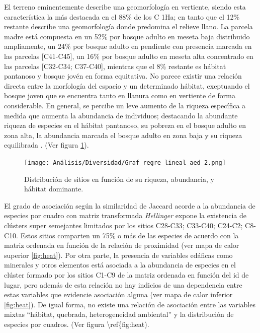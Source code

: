 \documentclass[11pt,]{article}
\begin{document}
El terreno eminentemente describe una geomorfología en vertiente, siendo
esta característica la más destacada en el 88\% de los C 1Ha; en tanto
que el 12\% restante describe una geomorfología donde predomina el
relieve llano. La parcela madre está compuesta en un 52\% por bosque
adulto en meseta baja distribuido ampliamente, un 24\% por bosque adulto
en pendiente con presencia marcada en las parcelas {[}C41-C45{]}, un
16\% por bosque adulto en meseta alta concentrado en las parcelas
{[}C32-C34; C37-C40{]}, mientras que el 8\% restante es hábitat
pantanoso y bosque jovén en forma equitativa. No parece existir una
relación directa entre la morfología del espacio y un determinado
hábitat, exeptuando el bosque joven que se encuentra tanto en llanura
como en vertiente de forma considerable. En general, se percibe un leve
aumento de la riqueza específica a medida que aumenta la abundancia de
individuos; destacando la abundante riqueza de especies en el hábitat
pantanoso, su pobreza en el bosque adulto en zona alta, la abundancia
marcada el bosque adulto en zona baja y su riqueza equilibrada . (Ver
figura \ref{fig:leal}).

\begin{figure}
\centering
\texttt{[image: Análisis/Diversidad/Graf\_regre\_lineal\_aed\_2.png]}
\caption{Distribución de sitios en función de su riqueza, abundancia, y
hábitat dominante.\label{fig:leal}}
\end{figure}

El grado de asociación según la similaridad de Jaccard acorde a la
abundancia de especies por cuadro con matriz transformada
\emph{Hellinger} expone la existencia de clústers super semejantes
limitados por los sitios C28-C33; C33-C40; C24-C2; C8-C10. Estos sitios
comparten un 75\% o más de las especies de acuerdo con la matriz
ordenada en función de la relación de proximidad (ver mapa de calor
superior \ref{fig:heat}). Por otra parte, la presencia de variables
edáficas como minerales y otros elementos está asociada a la abundancia
de especies en el clúster formado por los sitios C1-C9 de la matriz
ordenada en función del id de lugar, pero además de esta relación no hay
indicios de una dependencia entre estas variables que evidencie
asociación alguna (ver mapa de calor inferior \ref{fig:heat}). De igual
forma, no existe una relación de asociación entre las variables mixtas
``hábitat, quebrada, heterogeneidad ambiental'' y la distribución de
especies por cuadros. (Ver figura \textbackslash{}ref\{fig:heat).
\end{document}
